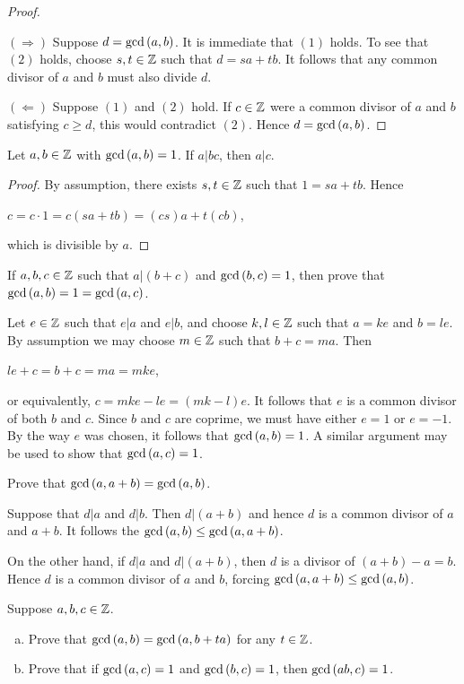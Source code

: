 \documentclass[11pt,fleqn,dvipsnames,usenames]{article}
\newcommand{\p}{\noindent}
\begin{document}
\begin{proof}~

$(\Rightarrow)$ Suppose $d = \text{gcd}\left(a, b\right)$.  It is immediate that $(1)$ holds.  To see that $(2)$ holds, choose $s,t\in\mathbb{Z}$ such that $d = sa + tb$.  It follows that any common divisor of $a$ and $b$ must also divide $d$.
\vsp

\p $(\Leftarrow)$ Suppose $(1)$ and $(2)$ hold.  If $c\in\mathbb{Z}$ were a common divisor of $a$ and $b$ satisfying $c\geq d$, this would contradict $(2)$.  Hence $d = \text{gcd}\left(a, b\right)$.
\end{proof}
%
\begin{corollary}\label{dividesproductonefactorcoprime}
Let $a,b\in\mathbb{Z}$ with $\text{gcd}\left(a,b\right) = 1$.  If $a|bc$, then $a|c$.
\end{corollary}
%
\begin{proof}
By assumption, there exists $s,t\in\mathbb{Z}$ such that $1 = sa + tb$.  Hence
\begin{center}
$c = c\cdot 1 = c(sa + tb) = (cs)a + t(cb)$,
\end{center}
which is divisible by $a$.
\end{proof}
%
\begin{example}
If $a,b,c\in\mathbb{Z}$ such that $a|(b+c)$ and $\text{gcd}\left(b,c\right) = 1$, then prove that $\text{gcd}\left(a,b\right) = 1 = \text{gcd}\left(a,c\right)$.
\end{example}
%
\begin{solution}
Let $e\in\mathbb{Z}$ such that $e|a$ and $e|b$, and choose $k,l\in\mathbb{Z}$ such that $a = ke$ and $b = le$.  By assumption we may choose $m\in\mathbb{Z}$ such that $b+c = ma$.  Then
\begin{center}
$le + c = b + c = ma = mke$,
\end{center}
or equivalently, $c = mke - le = (mk - l)e$.  It follows that $e$ is a common divisor of both $b$ and $c$.  Since $b$ and $c$ are coprime, we must have either $e =1$ or $e = -1$.  By the way $e$ was chosen, it follows that $\text{gcd}\left(a, b\right) = 1$.  A similar argument may be used to show that $\text{gcd}\left(a, c\right) = 1$.
\end{solution}
%
\begin{example}
Prove that $\text{gcd}\left(a, a+b\right) = \text{gcd}\left(a,b\right)$.
\end{example}
%
\begin{solution}
\p Suppose that $d|a$ and $d|b$.  Then $d|(a+b)$ and hence $d$ is a common divisor of $a$ and $a+b$.  It follows the $\text{gcd}\left(a,b\right)\leq \text{gcd}\left(a, a+b\right)$.
\vsp

\p On the other hand, if $d|a$ and $d|(a+b)$, then $d$ is a divisor of $(a+b) - a = b$.  Hence $d$ is a common divisor of $a$ and $b$, forcing $\text{gcd}\left(a, a+b\right)\leq \text{gcd}\left(a, b\right)$.
\end{solution}
%
\begin{exercise}
Suppose $a,b,c\in\mathbb{Z}$.
\begin{enumerate}[(a)]
\item Prove that $\text{gcd}\left(a, b\right) = \text{gcd}\left(a, b + ta\right)$ for any $t\in\mathbb{Z}$.
\item Prove that if $\text{gcd}\left(a,c\right) = 1$ and $\text{gcd}\left(b,c\right) = 1$, then $\text{gcd}\left(ab, c\right) = 1$.
\end{enumerate}
\end{exercise}
\end{document}
